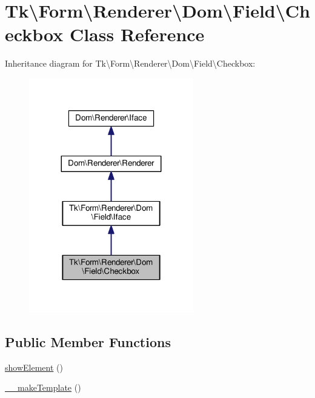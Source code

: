 \hypertarget{classTk_1_1Form_1_1Renderer_1_1Dom_1_1Field_1_1Checkbox}{\section{Tk\textbackslash{}Form\textbackslash{}Renderer\textbackslash{}Dom\textbackslash{}Field\textbackslash{}Checkbox Class Reference}
\label{classTk_1_1Form_1_1Renderer_1_1Dom_1_1Field_1_1Checkbox}
}


Inheritance diagram for Tk\textbackslash{}Form\textbackslash{}Renderer\textbackslash{}Dom\textbackslash{}Field\textbackslash{}Checkbox\+:\nopagebreak
\begin{figure}[H]
\begin{center}
\leavevmode
\includegraphics[width=203pt]{classTk_1_1Form_1_1Renderer_1_1Dom_1_1Field_1_1Checkbox__inherit__graph}
\end{center}
\end{figure}
\subsection*{Public Member Functions}
\begin{DoxyCompactItemize}
\item 
\hyperlink{classTk_1_1Form_1_1Renderer_1_1Dom_1_1Field_1_1Checkbox_aeac60284a329e1df6c3699bcb4a39a21}{show\+Element} ()
\item 
\hyperlink{classTk_1_1Form_1_1Renderer_1_1Dom_1_1Field_1_1Checkbox_a5ccb9bccb9c7d208115dca88d4435471}{\+\_\+\+\_\+make\+Template} ()
\end{DoxyCompactItemize}
